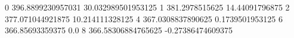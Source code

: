 0 396.8899230957031 30.032989501953125
1 381.2978515625 14.44091796875
2 377.071044921875 10.214111328125
4 367.0308837890625 0.1739501953125
6 366.85693359375 0.0
8 366.58306884765625 -0.27386474609375
